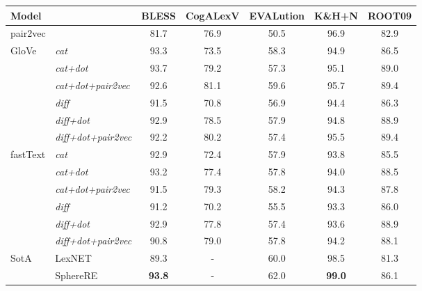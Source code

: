 \documentclass[3p]{elsarticle}
\begin{document}
{\begin{table}[!t]
\centering
\begin{tabular}{llccccc}
\toprule
Model && BLESS & CogALexV & EVALution & K\&H+N & ROOT09 \\
\midrule
\multicolumn{2}{l}{pair2vec} & 81.7 & 76.9 & 50.5 & 96.9 & 82.9\\ 
\midrule
\multirow{6}{*}{GloVe}  
  &            \textit{cat} & 93.3 & 73.5 & 58.3 & 94.9 & 86.5 \\
  &        \textit{cat+dot} & 93.7 & 79.2 & 57.3 & 95.1 & 89.0 \\
  &   \textit{cat+dot+pair2vec} & 92.6 &    81.1 &    59.6 &  95.7 & 89.4 \\
  &           \textit{diff} & 91.5 &     70.8 &    56.9 &    94.4  &   86.3 \\
  &       \textit{diff+dot} & 92.9 &    78.5 &     57.9 &   94.8 &     88.9 \\
  &  \textit{diff+dot+pair2vec} & 92.2 &     80.2 &     57.4 &     95.5 &     89.4 \\
\midrule
\multirow{6}{*}{fastText}  
  &            \textit{cat} &     92.9 &  72.4 &   57.9 &    93.8 &  85.5 \\
  &        \textit{cat+dot} &     93.2 &    77.4 &    57.8 &    94.0 &    88.5 \\
  &   \textit{cat+dot+pair2vec} &     91.5 &    79.3 &    58.2 &      94.3 &     87.8 \\
  &           \textit{diff} &     91.2 &    70.2 &    55.5 &   93.3 &     86.0 \\
  &       \textit{diff+dot} &       92.9 &    77.8 &     57.4 &      93.6 &     88.9 \\
  &  \textit{diff+dot+pair2vec} &   90.8 &    79.0 &    57.8 &     94.2 &    88.1 \\
  \midrule
\multirow{2}{*}{SotA}  
  & LexNET  & 89.3          & - & 60.0 & 98.5           & 81.3 \\
  & SphereRE& \textbf{93.8} & - & 62.0 & \textbf{99.0}  & 86.1 \\

\end{tabular}
\end{table}}
\end{document}
